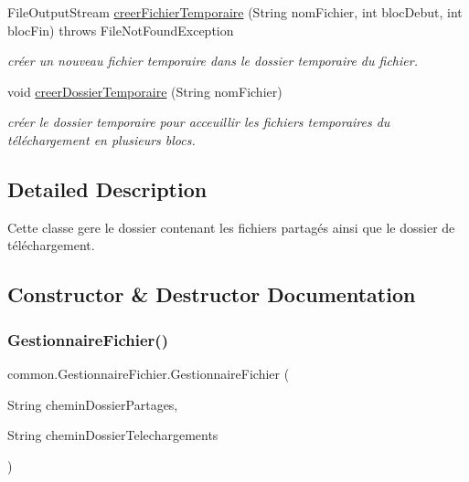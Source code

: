 \begin{DoxyCompactItemize}
File\+Output\+Stream \hyperlink{classcommon_1_1GestionnaireFichier_a0e950d470279008607afa8b6a525625e}{creer\+Fichier\+Temporaire} (String nom\+Fichier, int bloc\+Debut, int bloc\+Fin)  throws File\+Not\+Found\+Exception
\begin{DoxyCompactList}\small\item\em créer un nouveau fichier temporaire dans le dossier temporaire du fichier. \end{DoxyCompactList}\item 
void \hyperlink{classcommon_1_1GestionnaireFichier_aa32c12e7c7269b4142b4f93dc89603b7}{creer\+Dossier\+Temporaire} (String nom\+Fichier)
\begin{DoxyCompactList}\small\item\em créer le dossier temporaire pour acceuillir les fichiers temporaires du téléchargement en plusieurs blocs. \end{DoxyCompactList}\end{DoxyCompactItemize}


\subsection{Detailed Description}
Cette classe gere le dossier contenant les fichiers partagés ainsi que le dossier de téléchargement. 

\subsection{Constructor \& Destructor Documentation}
\mbox{\label{classcommon_1_1GestionnaireFichier_af063deb28fa952a2d0c605bc26659b16}} 
\subsubsection{\texorpdfstring{Gestionnaire\+Fichier()}{GestionnaireFichier()}}
{\footnotesize\ttfamily common.\+Gestionnaire\+Fichier.\+Gestionnaire\+Fichier (\begin{DoxyParamCaption}\item[{String}]{chemin\+Dossier\+Partages,  }\item[{String}]{chemin\+Dossier\+Telechargements }\end{DoxyParamCaption})\hspace{0.3cm}{\ttfamily [inline]}}



